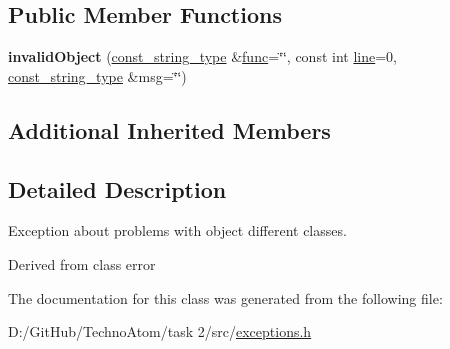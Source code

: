\subsection*{Public Member Functions}
\begin{DoxyCompactItemize}
\item 
\mbox{\label{classatom_1_1invalid_object_a70f97b01ac566e63753ee29e6e862228}} 
{\bfseries invalid\+Object} (\hyperlink{classatom_1_1error_ac330e9fb7cedcf4a173c5eb156d7bdaf}{const\+\_\+string\+\_\+type} \&\hyperlink{classatom_1_1error_a0a70a92b1638bfe4be7972651ae0c5c8}{func}=\char`\"{}\char`\"{}, const int \hyperlink{classatom_1_1error_aa9443d1a458d0dc6086372444a58e8c6}{line}=0, \hyperlink{classatom_1_1error_ac330e9fb7cedcf4a173c5eb156d7bdaf}{const\+\_\+string\+\_\+type} \&msg=\char`\"{}\char`\"{})
\end{DoxyCompactItemize}
\subsection*{Additional Inherited Members}


\subsection{Detailed Description}
Exception about problems with object different classes. 

Derived from class error 

The documentation for this class was generated from the following file\+:\begin{DoxyCompactItemize}
\item 
D\+:/\+Git\+Hub/\+Techno\+Atom/task 2/src/\hyperlink{exceptions_8h}{exceptions.\+h}\end{DoxyCompactItemize}

